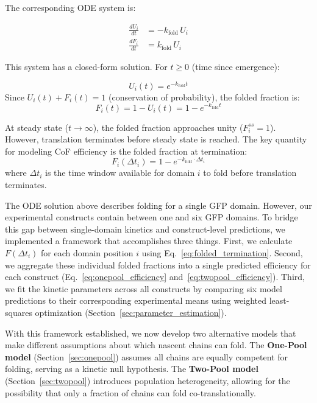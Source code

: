 \documentclass[11pt,a4paper]{article}
\newcommand{\kfold}{k_{\text{fold}}}
\begin{document}
\noindent The corresponding ODE system is:

\begin{align}
\frac{dU_i}{dt} &= -\kfold \, U_i \\[0.5em]
\frac{dF_i}{dt} &= \kfold \, U_i
\end{align}

\noindent This system has a closed-form solution. For $t \geq 0$ (time since emergence):

\begin{equation}
U_i(t) = e^{-\kfold t}
\end{equation}
Since $U_i(t) + F_i(t) = 1$ (conservation of probability), the folded fraction is:
\begin{equation}
F_i(t) = 1 - U_i(t) = 1 - e^{-\kfold t} \label{eq:folded_fraction}
\end{equation}

\noindent At steady state ($t \to \infty$), the folded fraction approaches unity ($F_i^{ss} = 1$). However, translation terminates before steady state is reached. The key quantity for modeling CoF efficiency is the folded fraction at termination:
\begin{equation}
F_i(\Delta t_i) = 1 - e^{-\kfold \cdot \Delta t_i} \label{eq:folded_termination}
\end{equation}
where $\Delta t_i$ is the time window available for domain $i$ to fold before translation terminates.

The ODE solution above describes folding for a single GFP domain. However, our experimental constructs contain between one and six GFP domains. To bridge this gap between single-domain kinetics and construct-level predictions, we implemented a framework that accomplishes three things. First, we calculate $F(\Delta t_i)$ for each domain position $i$ using Eq.~\ref{eq:folded_termination}. Second, we aggregate these individual folded fractions into a single predicted efficiency for each construct (Eq.~\ref{eq:onepool_efficiency} and~\ref{eq:twopool_efficiency}). Third, we fit the kinetic parameters across all constructs by comparing six model predictions to their corresponding experimental means using weighted least-squares optimization (Section~\ref{sec:parameter_estimation}). 

With this framework established, we now develop two alternative models that make different assumptions about which nascent chains can fold. The \textbf{One-Pool model} (Section~\ref{sec:onepool}) assumes all chains are equally competent for folding, serving as a kinetic null hypothesis. The \textbf{Two-Pool model} (Section~\ref{sec:twopool}) introduces population heterogeneity, allowing for the possibility that only a fraction of chains can fold co-translationally.
\end{document}
